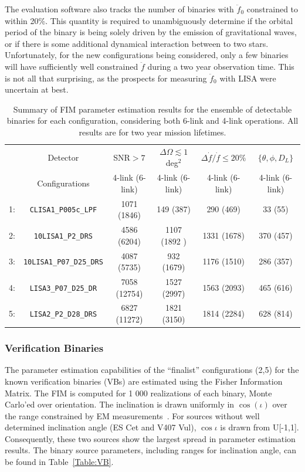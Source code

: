\documentclass{iopart}
\begin{document}
The evaluation software also tracks the number of binaries with $\ddot{f}_0$ constrained to within 20\%.  This quantity is 
required to unambiguously determine if the orbital period of the binary is being solely driven by the emission of gravitational 
waves, or if there is some additional dynamical interaction between to two stars.  Unfortunately, for the new configurations 
being considered, only a few binaries will have sufficiently well constrained $\ddot{f}$ during a two year observation time.  This is not all that surprising, as the prospects for measuring  $\ddot{f}_0$ with LISA were uncertain at best.
\begin{table}[H]
\begin{center}
\begin{tabular}{cccccc}
\hline\hline
& Detector & SNR$>7$ & $\Delta \Omega \lesssim 1$ deg$^2$ & $\Delta\dot{f}/\dot{f} \leq 20\%$ & $\{\theta,\phi,D_L\}$\\
& Configurations & 4-link (6-link) & 4-link (6-link) & 4-link (6-link)  & 4-link (6-link)\\
\hline
1: &{\tt CLISA1\_P005c\_LPF} & 1071 (1846) & 149 (387) & 290 (469) & 33 (55)\\
2: &{\tt 10LISA1\_P2\_DRS} & 4586 (6204) & 1107 (1892 )& 1331 (1678) & 370 (457)\\
3: &{\tt 10LISA1\_P07\_D25\_DRS} & 4087 (5735) & 932 (1679) & 1176 (1510) & 286 (357)\\
4: &{\tt LISA3\_P07\_D25\_DR} & 7058 (12754) & 1527 (2997) & 1563 (2093) & 465 (616) \\
5: &{\tt LISA2\_P2\_D28\_DRS} & 6827 (11272) & 1821 (3150) & 1814 (2284) & 628 (814) \\
\end{tabular}
\caption{Summary of FIM parameter estimation results for the ensemble of detectable binaries for each configuration, 
considering both 6-link and 4-link operations.  All results are for two year mission lifetimes. }
\label{Table:Fisher}
\end{center}
\end{table}

\subsubsection{Verification Binaries}
The parameter estimation capabilities of the ``finalist'' configurations (2,5) for the known verification binaries (VBs) are estimated 
using the Fisher Information Matrix.  The FIM is computed for 1 000 realizations of each binary, Monte Carlo'ed over orientation. The inclination is drawn uniformly in $\cos(\iota)$ over the range constrained by EM measurements~\cite{VBs}.  For sources without well determined inclination angle (ES Cet and V407 Vul), $\cos{\iota}$ is drawn from U[-1,1].  
Consequently, these two sources show the largest spread in parameter estimation results.  The binary source parameters, including ranges for inclination angle, can be found in Table~\ref{Table:VB}.
\end{document}
